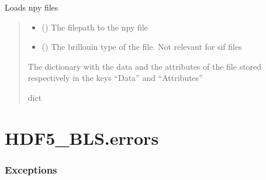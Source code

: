 \documentclass[letterpaper,10pt,english]{sphinxmanual}
\begin{document}
\begin{fulllineitems}
\label{\detokenize{source/_autosummary/HDF5_BLS.load_data:HDF5_BLS.load_data.load_sif_file}}
\pysigstartsignatures
\pysiglinewithargsret
{}
{\sphinxparamcomma {}\sphinxparamcomma {}}
{}
\pysigstopsignatures
\sphinxAtStartPar
Loads npy files
\begin{quote}\begin{description}
\begin{itemize}
\item {} 
\sphinxAtStartPar
{} () \textendash{} The filepath to the npy file

\item {} 
\sphinxAtStartPar
{} (\sphinxstyleliteralemphasis{\sphinxupquote{, }}) \textendash{} The brillouin type of the file. Not relevant for sif files

\end{itemize}

\sphinxAtStartPar
The dictionary with the data and the attributes of the file stored respectively in the keys “Data” and “Attributes”

\sphinxAtStartPar
dict

\end{description}\end{quote}

\end{fulllineitems}


\sphinxstepscope


\section{HDF5\_BLS.errors}
\label{\detokenize{source/_autosummary/HDF5_BLS.errors:module-HDF5_BLS.errors}}\label{\detokenize{source/_autosummary/HDF5_BLS.errors:hdf5-bls-errors}}\label{\detokenize{source/_autosummary/HDF5_BLS.errors::doc}}\subsubsection*{Exceptions}
\end{document}
